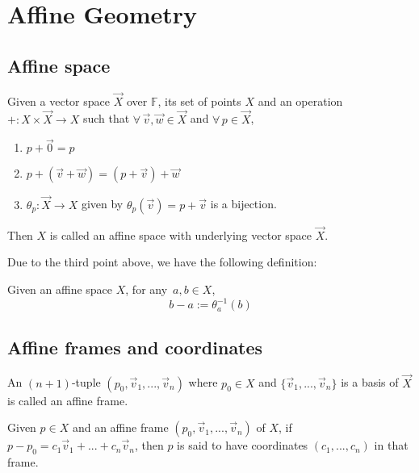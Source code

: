 \chapter{Affine Geometry}

\section{Affine space}

\begin{definition}
    Given a vector space $\vec{X}$ over $\mathbb{F}$, its set of points $X$ and
    an operation $+: X\times\vec{X} \to X$ such that $\forall\,\vec{v},\vec{w}\in\vec{X}$
    and $\forall\,p\in\vec{X}$,
    \begin{enumerate}
        \item $p + \vec{0} = p$
        \item $p + (\vec{v} + \vec{w}) = (p + \vec{v}) + \vec{w}$
        \item $\theta_{p} : \vec{X} \to X$ given by
            $\theta_{p}(\vec{v}) = p + \vec{v}$ is a bijection.
    \end{enumerate}
    Then $X$ is called an affine space with underlying vector space $\vec{X}$.
\end{definition}


\noindent
Due to the third point above, we have the following definition:

\begin{definition}
    Given an affine space $X$, for any $\,a,b \in X$,
    \[ b - a := \theta_a^{-1}(b) \]
\end{definition}

\section{Affine frames and coordinates}

\begin{definition}
    An $(n+1)$-tuple $(p_0,\vec{v}_1,...,\vec{v}_n)$ where $p_0 \in X$ and
    $\{\vec{v}_1,...,\vec{v}_n\}$ is a basis of $\vec{X}$ is called an affine
    frame.
\end{definition}

\noindent
Given $p \in X$ and an affine frame $(p_0,\vec{v}_1,...,\vec{v}_n)$ of $X$, if
$p-p_0=c_1\vec{v}_1+...+c_n\vec{v}_n$, then $p$ is said to have coordinates
$(c_1,...,c_n)$ in that frame.

